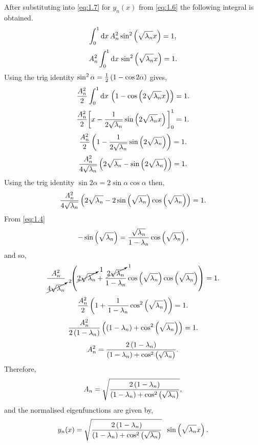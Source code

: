 \begin{description}[itemindent=-0.9cm]
After substituting into \eqref{eq:1.7} for $y_n(x)$ from \eqref{eq:1.6} the following integral is obtained.
\begin{equation*}
\label{eq:1.8}
	\int_{0}^{1}\mathrm{d} x\, A_n^2 \sin^2 \left( \sqrt{\lambda_n}x \right)= 1,
\end{equation*}
\[
	A_n^2 \int_{0}^{1}\mathrm{d} x\, \sin^2 \left( \sqrt{\lambda_n}x \right)= 1.
\]
Using the trig identity $\sin^2\alpha=\frac{1}{2}\left(1-\cos2\alpha\right)$ gives,
\[
	\frac{A_n^2}{2} \int_{0}^{1}\mathrm{d} x\,  \left(1-\cos\left(2\sqrt{\lambda_n}x\right)\right)= 1.
\]
\[
	\frac{A_n^2}{2} \bigg[x - \frac{1}{2\sqrt{\lambda_n}}\sin\left(2\sqrt{\lambda_n}x\right)\bigg]_0^1= 1.
\]
\[
	\frac{A_n^2}{2} \left(1 - \frac{1}{2\sqrt{\lambda_n}}\sin\left(2\sqrt{\lambda_n}\right)\right)= 1.
\]
\[
	\frac{A_n^2}{4\sqrt{\lambda_n} } \left(2\sqrt{\lambda_n} - \sin\left(2\sqrt{\lambda_n}\right)\right)= 1.
\]
Using the trig identity $\sin 2\alpha = 2\sin\alpha\cos\alpha$ then,
\[
	\frac{A_n^2}{4\sqrt{\lambda_n} } \left(2\sqrt{\lambda_n} - 2\sin\left(\sqrt{\lambda_n}\right)\cos\left(\sqrt{\lambda_n}\right)\right)= 1.
\]
From \eqref{eq:1.4}
\[
	-\sin\left(\sqrt{\lambda_n}\right) = \frac{\sqrt{\lambda_n}}{1-\lambda_n}\cos\left(\sqrt{\lambda_n}\right),
\]
and so,
\[
	\frac{A_n^2}{\cancelto{2}{4\sqrt{\lambda_n}} }\;\;\left(\cancelto{1}{2\sqrt{\lambda_n}} + \frac{\cancelto{1}{2\sqrt{\lambda_n}}}{1-\lambda_n }\cos\left(\sqrt{\lambda_n}\right)\cos\left(\sqrt{\lambda_n}\right)\right)= 1.
\]
\[
	\frac{A_n^2}{2} \left(1+ \frac{1}{1-\lambda_n }\cos^2\left(\sqrt{\lambda_n}\right)\right)= 1.
\]
\[
	\frac{A_n^2}{2\left(1-\lambda_n \right)} \left(\left(1-\lambda_n \right) + \cos^2\left(\sqrt{\lambda_n}\right)\right)= 1.
\]
\[
	A_n^2 = \frac{2\left(1-\lambda_n \right)}{{\left(1-\lambda_n \right) + \cos^2\left(\sqrt{\lambda_n}\right)}}.
\]
Therefore,
\[
	A_n = \sqrt{\frac{2\left(1-\lambda_n \right)}{\left(1-\lambda_n \right) + \cos^2\left(\sqrt{\lambda_n}\right)}},
\]
and the normalised eigenfunctions are given by,
\[
	y_n(x) = \sqrt{\frac{2\left(1-\lambda_n \right)}{\left(1-\lambda_n \right) + \cos^2\left(\sqrt{\lambda_n}\right)}}\;\; \sin\left(\sqrt{\lambda_n}x\right).
\]
\begin{comment}
As $n\rightarrow\infty$, $A_n\rightarrow\sqrt{2}$ and so,
\[
	y_n(x) = \sqrt{2} \sin\lr{\sqrt{\lambda_n}x},\qtq{as} n\rightarrow\infty.
\]
\end{comment}
\end{description}


